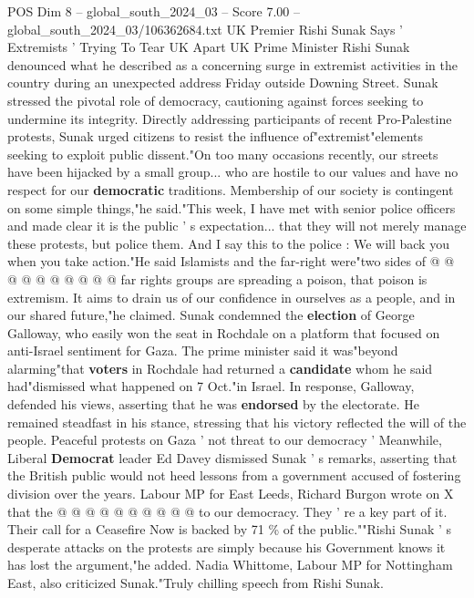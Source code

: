 \begin{textsample}{POS Dim 8 – global\_south\_2024\_03 – Score 7.00 – global\_south\_2024\_03/106362684.txt}  \label{ex:f8_pos_097}
UK Premier Rishi Sunak Says ' Extremists ' Trying To Tear UK Apart UK Prime Minister Rishi Sunak denounced what he described as a concerning surge in extremist activities in the country during an unexpected address Friday outside Downing Street.
Sunak stressed the pivotal role of democracy, cautioning against forces seeking to undermine its integrity.
Directly addressing participants of recent Pro-Palestine protests, Sunak urged citizens to resist the influence of"extremist"elements seeking to exploit public dissent."On too many occasions recently, our streets have been hijacked by a small group... who are hostile to our values and have no respect for our \textbf{democratic} traditions.
Membership of our society is contingent on some simple things,"he said."This week, I have met with senior police officers and made clear it is the public ' s expectation... that they will not merely manage these protests, but police them.
And I say this to the police : We will back you when you take action."He said Islamists and the far-right were"two sides of @ @ @ @ @ @ @ @ @ @ far rights groups are spreading a poison, that poison is extremism.
It aims to drain us of our confidence in ourselves as a people, and in our shared future,"he claimed.
Sunak condemned the \textbf{election} of George Galloway, who easily won the seat in Rochdale on a platform that focused on anti-Israel sentiment for Gaza.
The prime minister said it was"beyond alarming"that \textbf{voters} in Rochdale had returned a \textbf{candidate} whom he said had"dismissed what happened on 7 Oct."in Israel.
In response, Galloway, defended his views, asserting that he was \textbf{endorsed} by the electorate.
He remained steadfast in his stance, stressing that his victory reflected the will of the people.
Peaceful protests on Gaza ' not threat to our democracy ' Meanwhile, Liberal \textbf{Democrat} leader Ed Davey dismissed Sunak ' s remarks, asserting that the British public would not heed lessons from a government accused of fostering division over the years.
Labour MP for East Leeds, Richard Burgon wrote on X that the @ @ @ @ @ @ @ @ @ @ to our democracy.
They ' re a key part of it.
Their call for a Ceasefire Now is backed by 71 \% of the public.""Rishi Sunak ' s desperate attacks on the protests are simply because his Government knows it has lost the argument,"he added.
Nadia Whittome, Labour MP for Nottingham East, also criticized Sunak."Truly chilling speech from Rishi Sunak.

\end{textsample}
